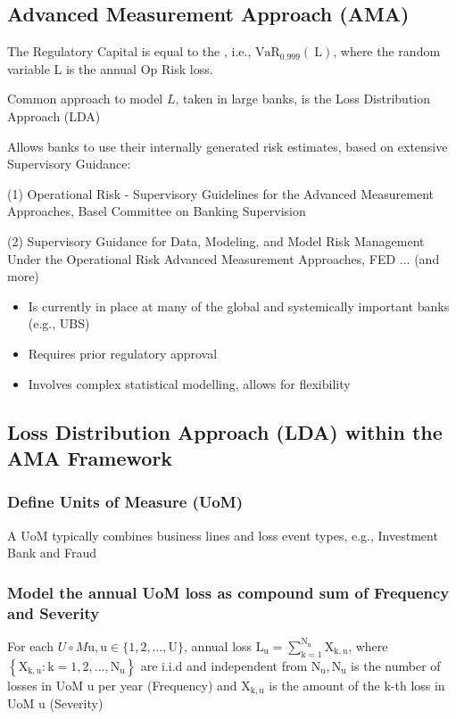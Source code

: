 \subsection*{Advanced Measurement Approach (AMA)}
The Regulatory Capital is equal to the , i.e., $\mathrm{VaR}_{0.999}(\mathrm{~L})$, where the random variable $\mathrm{L}$ is the annual Op Risk loss.

Common approach to model $L$, taken in large banks, is the Loss Distribution Approach (LDA)

Allows banks to use their internally generated risk estimates, based on extensive Supervisory Guidance:

(1) Operational Risk - Supervisory Guidelines for the Advanced Measurement Approaches, Basel Committee on Banking Supervision

(2) Supervisory Guidance for Data, Modeling, and Model Risk Management Under the Operational Risk Advanced Measurement Approaches, FED ... (and more)

\begin{itemize}[leftmargin=*]
    \item Is currently in place at many of the global and systemically important banks (e.g., UBS)
    \item Requires prior regulatory approval
    \item Involves complex statistical modelling, allows for flexibility
\end{itemize}





\subsection*{Loss Distribution Approach (LDA) within the AMA Framework}
\subsubsection*{Define Units of Measure (UoM)}
A UoM typically combines business lines and loss event types, e.g., Investment Bank and Fraud
\subsubsection*{Model the annual UoM loss as compound sum of Frequency and Severity}
For each $U \circ M \mathrm{u}, \mathrm{u} \in\{1,2, \ldots, \mathrm{U}\}$, annual loss $\mathrm{L}_{\mathrm{u}}=\sum_{\mathrm{k}=1}^{\mathrm{N}_{\mathrm{u}}} \mathrm{X}_{\mathrm{k}, \mathrm{u}}$, where $\left\{\mathrm{X}_{\mathrm{k}, \mathrm{u}}: \mathrm{k}=1,2, \ldots, \mathrm{N}_{\mathrm{u}}\right\}$ are i.i.d and independent from $\mathrm{N}_{\mathrm{u}}, \mathrm{N}_{\mathrm{u}}$ is the number of losses in UoM u per year (Frequency) and $\mathrm{X}_{\mathrm{k}, \mathrm{u}}$ is the amount of the $\mathrm{k}$-th loss in UoM $\mathrm{u}$ (Severity)

